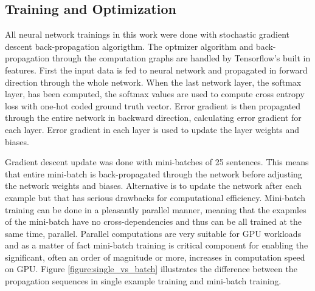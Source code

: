 \documentclass[12pt,a4paper,english
]{tutthesis}
\begin{document}
\subsection{Training and Optimization}
All neural network trainings in this work were done with stochastic gradient descent back-propagation algorigthm. The optmizer algorithm and back-propagation through the computation graphs are handled by Tensorflow's built in features. First the input data is fed to neural network and propagated in forward direction through the whole network. When the last network layer, the softmax layer, has been computed, the softmax values are used to compute cross entropy loss with one-hot coded ground truth vector. Error gradient is then propagated through the entire network in backward direction, calculating error gradient for each layer. Error gradient in each layer is used to update the layer weights and biases.

Gradient descent update was done with mini-batches of 25 sentences. This means that entire mini-batch is back-propagated through the network before adjusting the network weights and biases. Alternative is to update the network after each example but that has serious drawbacks for computational efficiency. Mini-batch training can be done in a pleasantly parallel manner, meaning that the exapmles of the mini-batch have no cross-dependencies and thus can be all trained at the same time, parallel. Parallel computations are very suitable for GPU workloads and as a matter of fact mini-batch training is critical component for enabling the significant, often an order of magnitude or more, increases in computation speed on GPU. Figure \ref{figure:single_vs_batch} illustrates the difference between the propagation sequences in single example training and mini-batch training.
\end{document}

